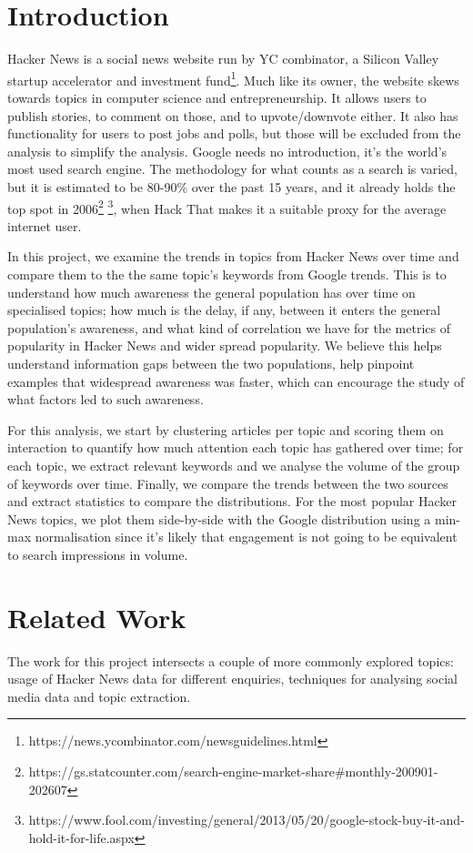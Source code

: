 \documentclass[nonacm,sigconf]{acmart}
\begin{document}
\section{Introduction}
Hacker News is a social news website run by YC combinator, a Silicon Valley startup accelerator and investment fund\footnote{https://news.ycombinator.com/newsguidelines.html}. Much like its owner, the website skews towards topics in computer science and entrepreneurship. It allows users to publish stories, to comment on those, and to upvote/downvote either. It also has functionality for users to post jobs and polls, but those will be excluded from the analysis to simplify the analysis. Google needs no introduction, it's the world's most used search engine. The methodology for what counts as a search is varied, but it is estimated to be 80-90\% over the past 15 years, and it already holds the top spot in 2006\footnote{https://gs.statcounter.com/search-engine-market-share\#monthly-200901-202607} \footnote{https://www.fool.com/investing/general/2013/05/20/google-stock-buy-it-and-hold-it-for-life.aspx}, when Hack That makes it a suitable proxy for the average internet user.
\par
In this project, we examine the trends in topics from Hacker News over time and compare them to the the same topic's keywords from Google trends. This is to understand how much awareness the general population has over time on specialised topics; how much is the delay, if any, between it enters the general population's awareness, and what kind of correlation we have for the metrics of popularity in Hacker News and wider spread popularity. We believe this helps understand information gaps between the two populations, help pinpoint examples that widespread awareness was faster, which can encourage the study of what factors led to such awareness.
\par
For this analysis, we start by clustering articles per topic and scoring them on interaction to quantify how much attention each topic has gathered over time; for each topic, we extract relevant keywords and we analyse the volume of the group of keywords over time. Finally, we compare the trends between the two sources and extract statistics to compare the distributions. For the most popular Hacker News topics, we plot them side-by-side with the Google distribution using a min-max normalisation since it's likely that engagement is not going to be equivalent to search impressions in volume.

\section{Related Work}
The work for this project intersects a couple of more commonly explored topics: usage of Hacker News data for different enquiries, techniques for analysing social media data and topic extraction.
\end{document}
